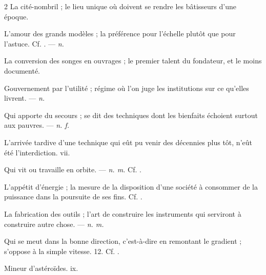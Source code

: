 \begin{multicols}{2}
 La cité-nombril ; le lieu unique où doivent se rendre les bâtisseurs d'une époque.  

 L'amour des grands modèles ; la préférence pour l'échelle plutôt que pour l'astuce. Cf. . —  \textit{n.}

 La conversion des songes en ouvrages ; le premier talent du fondateur, et le moins documenté.

 Gouvernement par l'utilité ; régime où l'on juge les institutions sur ce qu'elles livrent. —  \textit{n.}

 Qui apporte du secours ; se dit des techniques dont les bienfaits échoient surtout aux pauvres. —  \textit{n. f.}

 L'arrivée tardive d'une technique qui eût pu venir des décennies plus tôt, n'eût été l'interdiction.   vii.

 Qui vit ou travaille en orbite. —  \textit{n. m.} Cf. .

 L'appétit d'énergie ; la mesure de la disposition d'une société à consommer de la puissance dans la poursuite de ses fins. Cf. .

 La fabrication des outils ; l'art de construire les instruments qui serviront à construire autre chose. —  \textit{n. m.}

 Qui se meut dans la bonne direction, c'est-à-dire en remontant le gradient ; s'oppose à la simple vitesse.   12. Cf. .

 Mineur d'astéroïdes.   ix.


\end{multicols}
